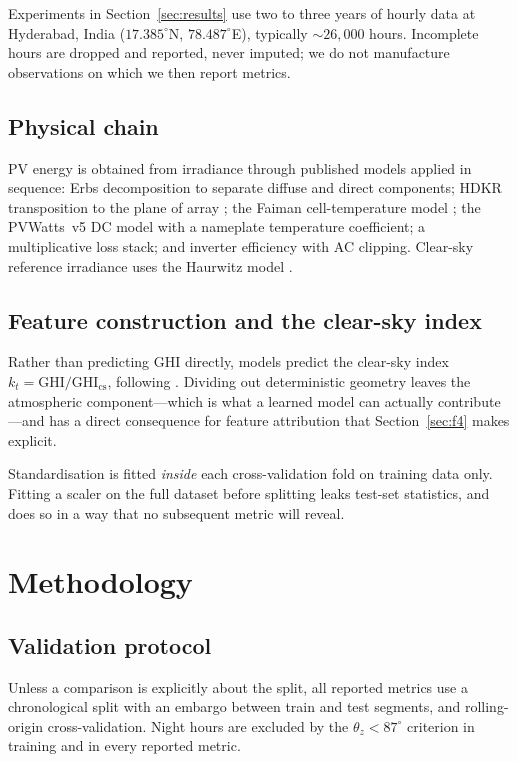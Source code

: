 \documentclass[conference]{IEEEtran}
\begin{document}
Experiments in Section~\ref{sec:results} use two to three years of
hourly data at Hyderabad, India ($17.385^{\circ}$N,
$78.487^{\circ}$E), typically ${\sim}26{,}000$ hours. Incomplete hours
are dropped and reported, never imputed; we do not manufacture
observations on which we then report metrics.

\subsection{Physical chain}

PV energy is obtained from irradiance through published models applied
in sequence: Erbs decomposition \cite{erbs1982} to separate diffuse and
direct components; HDKR transposition to the plane of array
\cite{duffie2013}; the Faiman cell-temperature model
\cite{faiman2008}; the PVWatts~v5 DC model \cite{dobos2014} with a
nameplate temperature coefficient; a multiplicative loss stack; and
inverter efficiency with AC clipping. Clear-sky reference irradiance
uses the Haurwitz model \cite{haurwitz1945}.

\subsection{Feature construction and the clear-sky index}

Rather than predicting GHI directly, models predict the clear-sky index
$k_{t} = \mathrm{GHI} / \mathrm{GHI}_{\mathrm{cs}}$, following
\cite{P1}. Dividing out deterministic geometry leaves the atmospheric
component---which is what a learned model can actually contribute---and
has a direct consequence for feature attribution that
Section~\ref{sec:f4} makes explicit.

Standardisation is fitted \emph{inside} each cross-validation fold on
training data only. Fitting a scaler on the full dataset before
splitting leaks test-set statistics, and does so in a way that no
subsequent metric will reveal.

\section{Methodology}

\subsection{Validation protocol}

Unless a comparison is explicitly about the split, all reported metrics
use a chronological split with an embargo between train and test
segments, and rolling-origin cross-validation. Night hours are excluded
by the $\theta_{z} < 87^{\circ}$ criterion in training and in every
reported metric.
\end{document}
